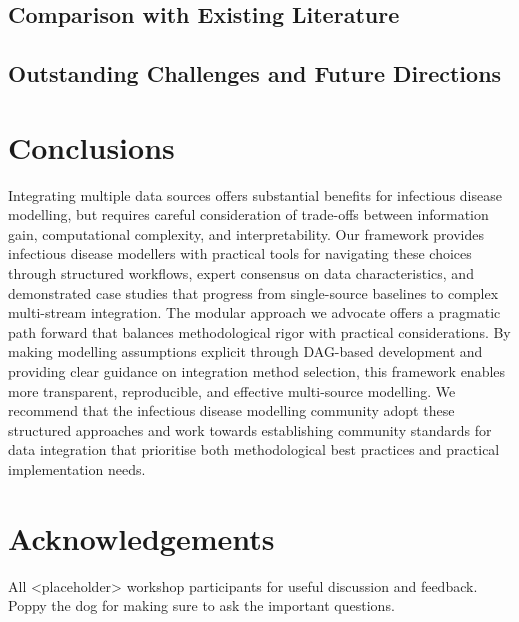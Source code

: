 \documentclass{article}
\begin{document}
\subsection{Comparison with Existing Literature}

\subsection{Outstanding Challenges and Future Directions}

\section{Conclusions}

Integrating multiple data sources offers substantial benefits for infectious disease modelling, but requires careful consideration of trade-offs between information gain, computational complexity, and interpretability.
Our framework provides infectious disease modellers with practical tools for navigating these choices through structured workflows, expert consensus on data characteristics, and demonstrated case studies that progress from single-source baselines to complex multi-stream integration.
The modular approach we advocate offers a pragmatic path forward that balances methodological rigor with practical considerations.
By making modelling assumptions explicit through DAG-based development and providing clear guidance on integration method selection, this framework enables more transparent, reproducible, and effective multi-source modelling.
We recommend that the infectious disease modelling community adopt these structured approaches and work towards establishing community standards for data integration that prioritise both methodological best practices and practical implementation needs.

\section{Acknowledgements}

All <placeholder> workshop participants for useful discussion and feedback. Poppy the dog for making sure to ask the important questions.



\end{document}
